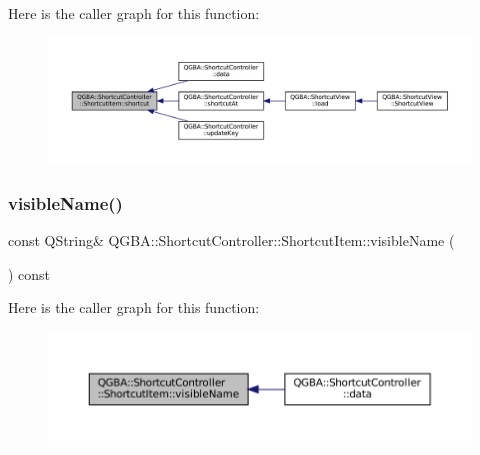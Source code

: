 Here is the caller graph for this function\+:
\nopagebreak
\begin{figure}[H]
\begin{center}
\leavevmode
\includegraphics[width=350pt]{class_q_g_b_a_1_1_shortcut_controller_1_1_shortcut_item_a9dad28d0bb9557439965aad43e19918b_icgraph}
\end{center}
\end{figure}
\mbox{\label{class_q_g_b_a_1_1_shortcut_controller_1_1_shortcut_item_ae2d16e4707f16335037bf37d2e4778e7}} 
\subsubsection{\texorpdfstring{visible\+Name()}{visibleName()}}
{\footnotesize\ttfamily const Q\+String\& Q\+G\+B\+A\+::\+Shortcut\+Controller\+::\+Shortcut\+Item\+::visible\+Name (\begin{DoxyParamCaption}{ }\end{DoxyParamCaption}) const\hspace{0.3cm}{\ttfamily [inline]}}

Here is the caller graph for this function\+:
\nopagebreak
\begin{figure}[H]
\begin{center}
\leavevmode
\includegraphics[width=350pt]{class_q_g_b_a_1_1_shortcut_controller_1_1_shortcut_item_ae2d16e4707f16335037bf37d2e4778e7_icgraph}
\end{center}
\end{figure}


